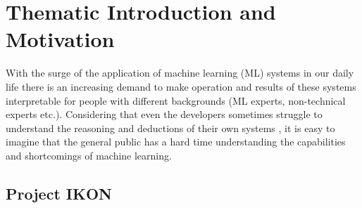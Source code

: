 %
\chapter{Thematic Introduction and Motivation}
\label{chap:introduction}

With the surge of the application of machine learning (ML) systems in our daily life there is an increasing demand to make operation and results of these systems interpretable for people with different backgrounds (ML experts, non-technical experts etc.). Considering that even the developers sometimes struggle to understand the reasoning and deductions of their own systems \cite{DeepPhenomena}, it is easy to imagine that the general public has a hard time understanding the capabilities and shortcomings of machine learning.

\section{Project IKON}

